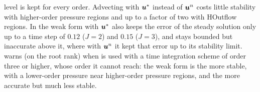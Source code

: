 level is kept for every order. Advecting with $\boldsymbol{u}^*$ instead of
$\boldsymbol{u}^n$ costs little stability with higher-order pressure regions and
up to a factor of two with HOutflow regions. In 
the weak form with $\boldsymbol{u}^*$ also keeps the error of the steady solution
only up to a time step of $0.12$ ($J=2$) and $0.15$ ($J=3$), and stays
bounded but inaccurate above it, where with $\boldsymbol{u}^n$ it kept that error
up to its stability limit. 
warns (on the root rank) when  is used with
a time integration scheme of order three or higher, whose order it cannot
reach: the weak form is the more stable, with a lower-order pressure near
higher-order pressure regions, and  the more
accurate but much less stable.


